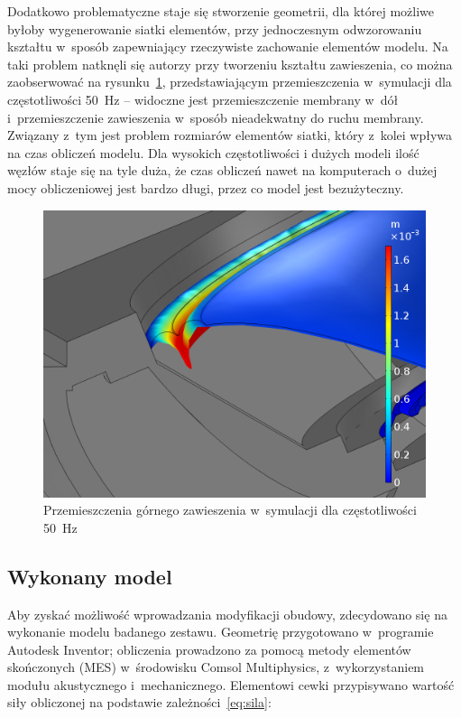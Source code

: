 \documentclass[12pt]{oska}
\begin{document}
		Dodatkowo problematyczne staje się stworzenie geometrii, dla której możliwe byłoby wygenerowanie siatki elementów, przy jednoczesnym odwzorowaniu kształtu w~sposób zapewniający rzeczywiste zachowanie elementów modelu. Na taki problem natknęli się autorzy przy tworzeniu kształtu zawieszenia, co można zaobserwować na rysunku~\ref{r:zawieszenie}, przedstawiającym przemieszczenia w~symulacji dla częstotliwości \SI{50}{\hertz} -- widoczne jest przemieszczenie membrany w~dół i~przemieszczenie zawieszenia w~sposób nieadekwatny do ruchu membrany.
		Związany z~tym jest problem rozmiarów elementów siatki, który z~kolei wpływa na czas obliczeń modelu. Dla wysokich częstotliwości i dużych modeli ilość węzłów staje się na tyle duża, że czas obliczeń nawet na komputerach o~dużej mocy obliczeniowej jest bardzo długi, przez co model jest bezużyteczny.
		
		\begin{figure}[!ht]
			\centering
			\includegraphics[width=.7\textwidth]{disp_factor5_f50_02.png}
			\caption{Przemieszczenia górnego zawieszenia w~symulacji dla częstotliwości \SI{50}{\hertz}}
			\label{r:zawieszenie}
		\end{figure}
		
	\subsection{Wykonany model}
	
		Aby zyskać możliwość wprowadzania modyfikacji obudowy, zdecydowano się na wykonanie modelu badanego zestawu. Geometrię przygotowano w~programie Autodesk Inventor; obliczenia prowadzono za pomocą metody elementów skończonych (MES) w~środowisku Comsol Multiphysics, z~wykorzystaniem modułu akustycznego i~mechanicznego. Elementowi cewki przypisywano wartość siły obliczonej na podstawie zależności~\eqref{eq:sila}:
		
\end{document}
